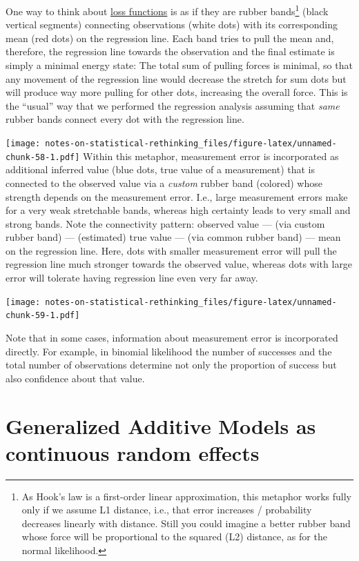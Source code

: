 \documentclass[
]{book}
\begin{document}
One way to think about \protect\hyperlink{loss-functions}{loss functions} is as if they are rubber bands\footnote{As Hook's law is a first-order linear approximation, this metaphor works fully only if we assume L1 distance, i.e., that error increases / probability decreases linearly with distance. Still you could imagine a better rubber band whose force will be proportional to the squared (L2) distance, as for the normal likelihood.} (black vertical segments) connecting observations (white dots) with its corresponding mean (red dots) on the regression line. Each band tries to pull the mean and, therefore, the regression line towards the observation and the final estimate is simply a minimal energy state: The total sum of pulling forces is minimal, so that any movement of the regression line would decrease the stretch for sum dots but will produce way more pulling for other dots, increasing the overall force. This is the ``usual'' way that we performed the regression analysis assuming that \emph{same} rubber bands connect every dot with the regression line.

\texttt{[image: notes-on-statistical-rethinking\_files/figure-latex/unnamed-chunk-58-1.pdf]}
Within this metaphor, measurement error is incorporated as additional inferred value (blue dots, true value of a measurement) that is connected to the observed value via a \emph{custom} rubber band (colored) whose strength depends on the measurement error. I.e., large measurement errors make for a very weak stretchable bands, whereas high certainty leads to very small and strong bands. Note the connectivity pattern: observed value --- (via custom rubber band) --- (estimated) true value --- (via common rubber band) --- mean on the regression line. Here, dots with smaller measurement error will pull the regression line much stronger towards the observed value, whereas dots with large error will tolerate having regression line even very far away.

\texttt{[image: notes-on-statistical-rethinking\_files/figure-latex/unnamed-chunk-59-1.pdf]}

Note that in some cases, information about measurement error is incorporated directly. For example, in binomial likelihood the number of successes and the total number of observations determine not only the proportion of success but also confidence about that value.

\hypertarget{generalized-additive-models-as-continuous-random-effects}{%
\chapter{Generalized Additive Models as continuous random effects}\label{generalized-additive-models-as-continuous-random-effects}}
\end{document}
